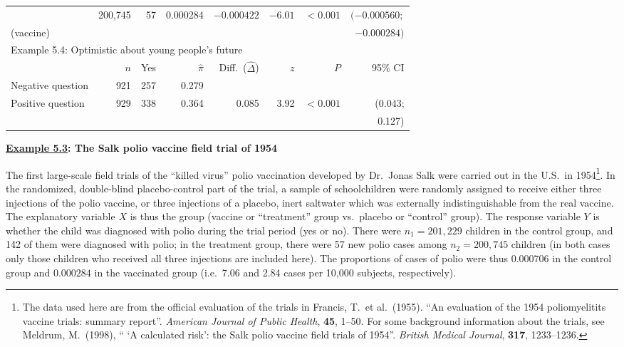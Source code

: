 \begin{table}[t]
\begin{small}
\begin{center}
\begin{tabular}{|lrrrrrrr|}
& 200,745 & 57& 0.000284 & $-0.000422$
& $-6.01$& $<0.001$&  $(-0.000560;$ \\
\hspace{.5em}(vaccine)
& & & & & & & $-0.000284)$ \\[1ex] \hline
\multicolumn{8}{|l|}{\rule[1mm]{0mm}{3mm}Example 5.4: Optimistic about young people's future}\\
& $n$ & Yes & $\hat{\pi}$ & Diff.\ ($\hat{\Delta}$)& $z$ & $P$ & 95\% CI \\ \hline
\hspace*{.5em}\rule[1mm]{0mm}{3mm}Negative question
& 921 & 257& 0.279 & & & &   \\
\hspace*{.5em}Positive question
& 929 & 338& 0.364 & 0.085 & 3.92& $<0.001$& (0.043;\\
& & & & & & & 0.127) \\
\hline
\end{tabular}
\end{center}
\end{small}
\end{table}

\textbf{\underline{Example 5.3}:
The Salk polio vaccine field trial of 1954}

The first large-scale field trials of the ``killed virus'' polio
vaccination developed by Dr.\ Jonas Salk were carried out in the U.S.\
in 1954\footnote{The data used here are from the official evaluation of
the trials in Francis, T.\ et al.\ (1955). ``An evaluation of the 1954
poliomyelitits vaccine trials: summary report''. \emph{American Journal
of Public Health}, \textbf{45}, 1--50. For some background information
about the trials, see Meldrum, M.\ (1998), `` `A calculated risk': the
Salk polio vaccine field trials of 1954''. \emph{British Medical
Journal}, \textbf{317}, 1233--1236.}. In the randomized, double-blind
placebo-control part of the trial, a sample of schoolchildren were
randomly assigned to receive either three injections of the polio
vaccine, or three injections of a placebo, inert saltwater which was
externally indistinguishable from the real vaccine. The explanatory
variable $X$ is thus the group (vaccine or ``treatment'' group vs.\
placebo or ``control'' group). The response  variable $Y$ is whether the
child was diagnosed with polio during the trial period (yes or no).
There were $n_{1}=201,229$ children in the control group, and 142 of
them were diagnosed with polio; in the treatment group, there were 57
new polio cases among $n_{2}=200,745$ children (in both cases only those
children who received all three injections are included here). The
proportions of cases of polio were thus
$0.000706$ in the control group
and $0.000284$ in the vaccinated group (i.e.\
7.06 and 2.84 cases per 10,000
subjects, respectively).

